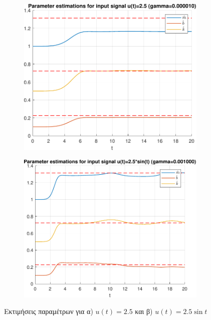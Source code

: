 \documentclass[a4paper,12pt]{article}
\begin{document}
\begin{figure}[h!]
    \centering
    \begin{subfigure}{0.45\textwidth}
        \centering
        \includegraphics[width=\linewidth]{plot/parameter_estimations_1.pdf}
        \caption{}
        \label{fig:parameter_estimations_1}
    \end{subfigure}
    \hfill
    \begin{subfigure}{0.45\textwidth}
        \centering
        \includegraphics[width=\linewidth]{plot/parameter_estimations_2.pdf}
        \caption{}
        \label{fig:parameter_estimations_2}
    \end{subfigure}
    \caption{Εκτιμήσεις παραμέτρων για α) $u(t) = 2.5$ και β) $u(t) = 2.5 \sin t$}
    \label{fig:parameter_estimations}
\end{figure}
\end{document}
